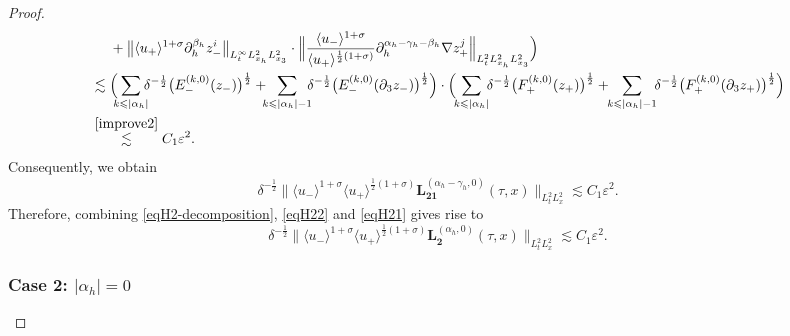 \documentclass[10pt,reqno]{amsart}
\numberwithin{equation}{section}
\begin{document}
\begin{proof}
\begin{align*}
		&\ \ \ \ +\big\|\langle u_+\rangle^{1+\sigma}\partial_{h}^{\beta_h} z_-^i\big\|_{L^\infty_tL^2_{x_h}L^2_{x_3}}\cdot\Big\|\frac{\langle u_-\rangle^{1+\sigma}}{\langle u_+\rangle^{\frac{1}{2}(1+\sigma)}}\partial_{h}^{\alpha_h-\gamma_h-\beta_h}\nabla z_+^j\Big\|_{L^2_tL^2_{x_h}L^2_{x_3}}\Big)\\
		&\lesssim \Big(\!\!\!\sum_{k\leqslant|\alpha_h|}\!\!\!\delta^{-\frac{1}{2}}\big(E_-^{(k,0)}(z_-)\big)^{\frac{1}{2}} +\!\!\!\sum_{k\leqslant|\alpha_h|-1}\!\!\!\delta^{-\frac{1}{2}}\big(E_-^{(k,0)}(\partial_3z_-)\big)^{\frac{1}{2}}\Big) \cdot\Big(\!\!\sum_{k\leqslant|\alpha_h|}\!\!\delta^{-\frac{1}{2}}\big(F_+^{(k,0)}(z_+)\big)^{\frac{1}{2}}+\!\!\sum_{k\leqslant|\alpha_h|-1}\!\!\delta^{-\frac{1}{2}}\big(F_+^{(k,0)}(\partial_3z_+)\big)^{\frac{1}{2}}\Big)\\
		&\stackrel{\eqref{improve2}}{\lesssim} C_1\varepsilon^2.
	\end{align*}
	Consequently, we obtain 
	\begin{equation}\label{eqH21}
		\delta^{-\frac{1}{2}}\big\|\langle u_-\rangle^{1+\sigma}\langle u_+\rangle^{\frac{1}{2}(1+\sigma)}\mathbf{L}_{\mathbf{21}}^{(\alpha_h-\gamma_h,0)}(\tau,x)\big\|_{L^2_tL^2_x}\lesssim C_1\varepsilon^2.
	\end{equation}
	Therefore, combining \eqref{eqH2-decomposition}, \eqref{eqH22} and \eqref{eqH21} gives rise to
	\begin{equation}\label{eqH2estimate} \delta^{-\frac{1}{2}}\big\|\langle u_-\rangle^{1+\sigma}\langle u_+\rangle^{\frac{1}{2}(1+\sigma)}\mathbf{L}_{\mathbf{2}}^{(\alpha_h,0)}(\tau,x)\big\|_{L^2_tL^2_x}\lesssim C_1\varepsilon^2.
	\end{equation}
	
	\subsubsection*{\bf Case 2:  $|\alpha_h|=0$}
	

\end{proof}
\end{document}
